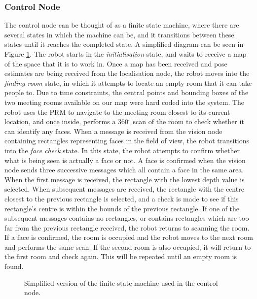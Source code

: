 \documentclass[conference]{IEEEtran}
\begin{document}
\subsubsection{Control Node}
\label{sec:control}
The control node can be thought of as a finite state machine, where there are several states in which the machine can be, and it transitions between these states until it reaches the completed state. A simplified diagram can be seen in Figure \ref{fig:fsm}. The robot starts in the \emph{initialisation} state, and waits to receive a map of the space that it is to work in. Once a map has been received and pose estimates are being received from the localisation node, the robot moves into the \emph{finding room} state, in which it attempts to locate an empty room that it can take people to. Due to time constraints, the central points and bounding boxes of the two meeting rooms available on our map were hard coded into the system. The robot uses the PRM to navigate to the meeting room closest to its current location, and once inside, performs a 360$^\circ$ scan of the room to check whether it can identify any faces. When a message is received from the vision node containing rectangles representing faces in the field of view, the robot transitions into the \emph{face check} state. In this state, the robot attempts to confirm whether what is being seen is actually a face or not. A face is confirmed when the vision node sends three successive messages which all contain a face in the same area. When the first message is received, the rectangle with the lowest depth value is selected. When subsequent messages are received, the rectangle with the centre closest to the previous rectangle is selected, and a check is made to see if this rectangle's centre is within the bounds of the previous rectangle. If one of the subsequent messages contains no rectangles, or contains rectangles which are too far from the previous rectangle received, the robot returns to scanning the room. If a face is confirmed, the room is occupied and the robot moves to the next room and performs the same scan. If the second room is also occupied, it will return to the first room and check again. This will be repeated until an empty room is found.
\begin{figure}
  \centering
  \caption{Simplified version of the finite state machine used in the control node.}
  \label{fig:fsm}
\end{figure}
\end{document}
